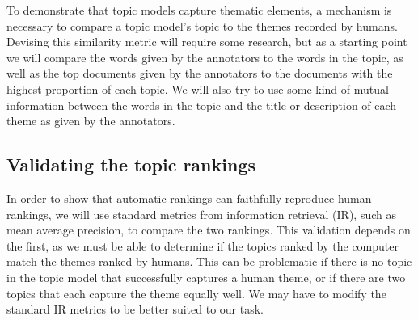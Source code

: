 \documentclass[onecolumn, 11pt]{article}
\begin{document}
To demonstrate that topic models capture thematic elements, a mechanism is
necessary to compare a topic model's topic to the themes recorded by humans.
Devising this similarity metric will require some research, but as a starting
point we will compare the words given by the annotators to the words in the
topic, as well as the top documents given by the annotators to the documents
with the highest proportion of each topic.  We will also try to use some kind
of mutual information between the words in the topic and the title or
description of each theme as given by the annotators.

\subsection{Validating the topic rankings}

In order to show that automatic rankings can faithfully reproduce human
rankings, we will use standard metrics from information retrieval (IR), such as
mean average precision, to compare the two rankings.  This validation depends
on the first, as we must be able to determine if the topics ranked by the
computer match the themes ranked by humans.  This can be problematic if there
is no topic in the topic model that successfully captures a human theme, or if
there are two topics that each capture the theme equally well.  We may have to
modify the standard IR metrics to be better suited to our task.
\end{document}
